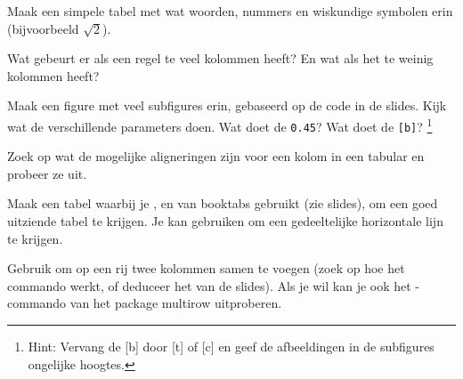 \documentclass[a4paper]{article}
\begin{document}
\begin{exercise}
    Maak een simpele tabel met wat woorden, nummers en wiskundige symbolen erin (bijvoorbeeld $ \sqrt{2} $).
\end{exercise}

\begin{exercise}[Kolomscheidingen]
    Wat gebeurt er als een regel te veel kolommen heeft? En wat als het te
    weinig kolommen heeft?
\end{exercise}

\begin{exercise}[Subfigure]
    Maak een figure met veel subfigures erin, gebaseerd op de code in de slides. Kijk wat de verschillende parameters
    doen. Wat doet de \texttt{0.45\textwidth}? Wat doet de \texttt{[b]}?%
    \footnote{Hint: Vervang de [b] door [t] of [c] en geef de afbeeldingen in de subfigures
        ongelijke hoogtes.}
\end{exercise}

\begin{exercise}[Alignering]
    Zoek op wat de mogelijke aligneringen zijn voor een kolom in een tabular
    en probeer ze uit.
\end{exercise}

\begin{exercise}[Booktabs]
    Maak een tabel waarbij je \texttt{\toprule}, \texttt{\midrule}
    en \texttt{\bottom} van booktabs gebruikt (zie slides), om
    een goed uitziende tabel te krijgen. Je kan \texttt{\cmidrule} gebruiken om een
    gedeeltelijke horizontale lijn te krijgen.
\end{exercise}

\begin{exercise}[Excellent]
    Gebruik \texttt{\multicolumn} om op een rij twee kolommen samen te voegen
    (zoek op hoe het commando werkt, of deduceer het van de slides). Als je
    wil kan je ook het \texttt{\multirow}-commando van het package multirow
    uitproberen.
\end{exercise}


\end{document}
